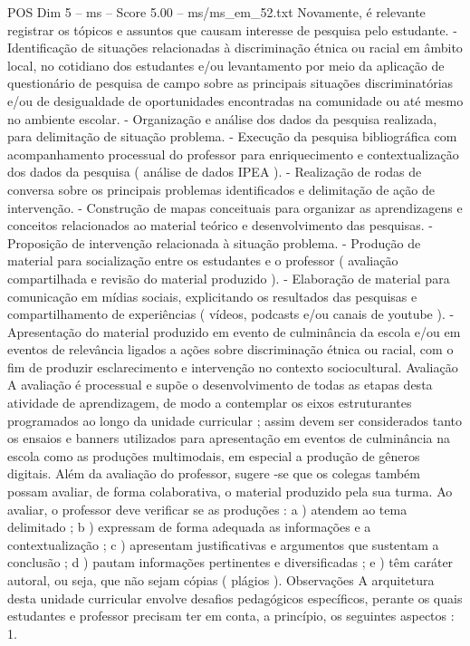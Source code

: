 \begin{textsample}{POS Dim 5 – ms – Score 5.00 – ms/ms\_em\_52.txt}
Novamente, é relevante registrar os tópicos e assuntos que causam interesse de pesquisa pelo estudante. - Identificação de situações relacionadas à discriminação étnica ou racial em âmbito local, no cotidiano dos estudantes e/ou levantamento por meio da aplicação de questionário de pesquisa de campo sobre as principais situações discriminatórias e/ou de desigualdade de oportunidades encontradas na comunidade ou até mesmo no ambiente escolar. - Organização e análise dos dados da pesquisa realizada, para delimitação de situação problema. - Execução da pesquisa bibliográfica com acompanhamento processual do professor para enriquecimento e contextualização dos dados da pesquisa ( análise de dados IPEA ). - Realização de rodas de conversa sobre os principais problemas identificados e delimitação de ação de intervenção. - Construção de mapas conceituais para organizar as aprendizagens e conceitos relacionados ao material teórico e desenvolvimento das pesquisas. - Proposição de intervenção relacionada à situação problema. - Produção de material para socialização entre os estudantes e o professor ( avaliação compartilhada e revisão do material produzido ). - Elaboração de material para comunicação em mídias sociais, explicitando os resultados das pesquisas e compartilhamento de experiências ( vídeos, podcasts e/ou canais de youtube ). - Apresentação do material produzido em evento de culminância da escola e/ou em eventos de relevância ligados a ações sobre discriminação étnica ou racial, com o fim de produzir esclarecimento e intervenção no contexto sociocultural.
Avaliação A avaliação é processual e supõe o desenvolvimento de todas as etapas desta atividade de aprendizagem, de modo a contemplar os eixos estruturantes programados ao longo da unidade curricular ; assim devem ser considerados tanto os ensaios e banners utilizados para apresentação em eventos de culminância na escola como as produções multimodais, em especial a produção de gêneros digitais.
Além da avaliação do professor, sugere -se que os colegas também possam avaliar, de forma colaborativa, o material produzido pela sua turma.
Ao avaliar, o professor deve verificar se as produções : a ) atendem ao tema delimitado ; b ) expressam de forma adequada as informações e a contextualização ; c ) apresentam justificativas e argumentos que sustentam a conclusão ; d ) pautam informações pertinentes e diversificadas ; e ) têm caráter autoral, ou seja, que não sejam cópias ( plágios ).
Observações A arquitetura desta unidade curricular envolve desafios pedagógicos específicos, perante os quais estudantes e professor precisam ter em conta, a princípio, os seguintes aspectos : 1.

\end{textsample}

